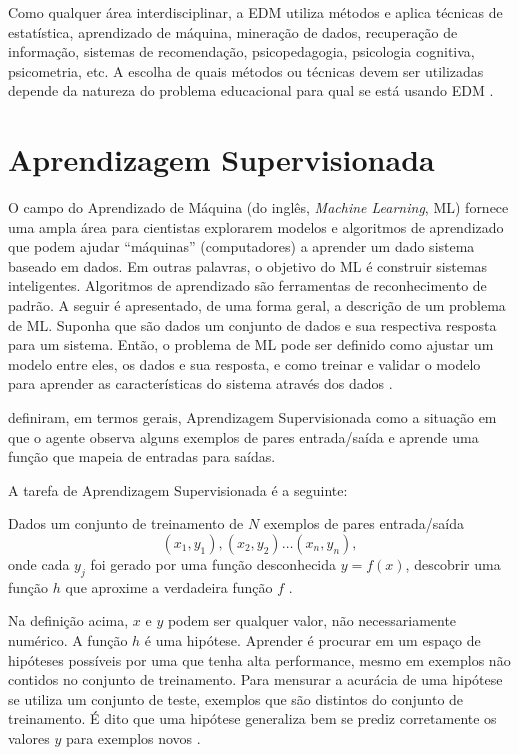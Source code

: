 Como qualquer área interdisciplinar, a EDM utiliza métodos e aplica técnicas de
estatística, aprendizado de máquina, mineração de dados, recuperação de
informação, sistemas de recomendação, psicopedagogia, psicologia cognitiva,
psicometria, etc. A escolha de quais métodos ou técnicas devem ser utilizadas
depende da natureza do problema educacional para qual se está usando EDM
\cite{bousbia2014contribution}.

\section{Aprendizagem Supervisionada}

O campo do Aprendizado de Máquina (do inglês, \textit{Machine Learning}, ML)
fornece uma ampla área para cientistas explorarem modelos e algoritmos de
aprendizado que podem ajudar ``máquinas'' (computadores) a aprender um dado
sistema baseado em dados. Em outras palavras, o objetivo do ML é construir
sistemas inteligentes. Algoritmos de aprendizado são ferramentas de
reconhecimento de padrão. A seguir é apresentado, de uma forma geral, a
descrição de um problema de ML. Suponha que são dados um conjunto de dados e sua
respectiva resposta para um sistema. Então, o problema de ML pode ser definido
como ajustar um modelo entre eles, os dados e sua resposta, e como treinar e
validar o modelo para aprender as características do sistema através dos dados
\cite{suthaharan2016machine}.

 definiram, em termos gerais, Aprendizagem
Supervisionada como a situação em que o agente observa alguns exemplos de pares
entrada/saída e aprende uma função que mapeia de entradas para saídas.

A tarefa de Aprendizagem Supervisionada é a seguinte:

Dados um conjunto de treinamento de \(N\) exemplos de pares entrada/saída
\[ (x_1,y_1),(x_2,y_2)\ldots(x_n,y_n), \]
onde cada \(y_j\) foi gerado por uma função desconhecida \(y = f(x)\), descobrir
uma função \(h\) que aproxime a verdadeira função \(f\)
\cite{russell2011artificial}.

Na definição acima, \(x\) e \(y\) podem ser qualquer valor, não necessariamente
numérico. A função \(h\) é uma hipótese. Aprender é procurar em um espaço de
hipóteses possíveis por uma que tenha alta performance, mesmo em exemplos não
contidos no conjunto de treinamento. Para mensurar a acurácia de uma hipótese se
utiliza um conjunto de teste, exemplos que são distintos do conjunto de
treinamento. É dito que uma hipótese generaliza bem se prediz corretamente os
valores \(y\) para exemplos novos \cite{russell2011artificial}.

